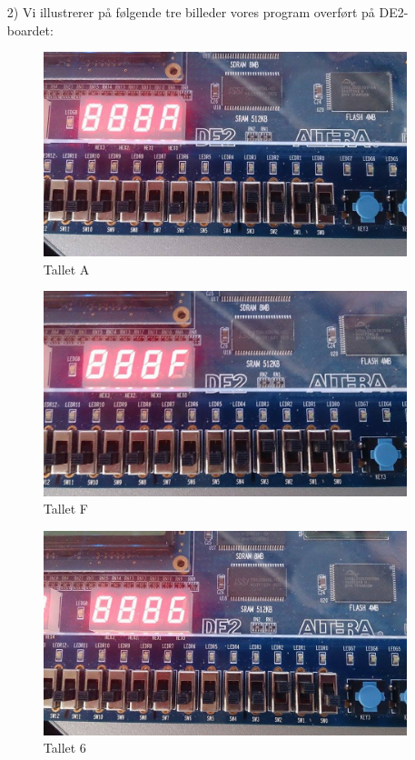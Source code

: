 \begin{enumerate}
\item[2)]
Vi illustrerer på følgende tre billeder vores program overført på DE2-boardet:
	\begin{figure}[h]
		\centering
		\includegraphics[scale=0.3]{pictures/Oevelse5/opg2/binTo7SegHexA.JPG}
		\caption{Tallet A}
		\label{fig:binTo7SegHexA}
	\end{figure}
	\begin{figure}[h]
		\centering
		\includegraphics[scale=0.3]{pictures/Oevelse5/opg2/binTo7SegHexF.JPG}
		\caption{Tallet F}
		\label{fig:binTo7SegHexF}
	\end{figure}
	\begin{figure}[h]
		\centering
		\includegraphics[scale=0.3]{pictures/Oevelse5/opg2/binTo7SegHex6.JPG}
		\caption{Tallet 6}
		\label{fig:binTo7SegHex6}
	\end{figure}
\end{enumerate}	
